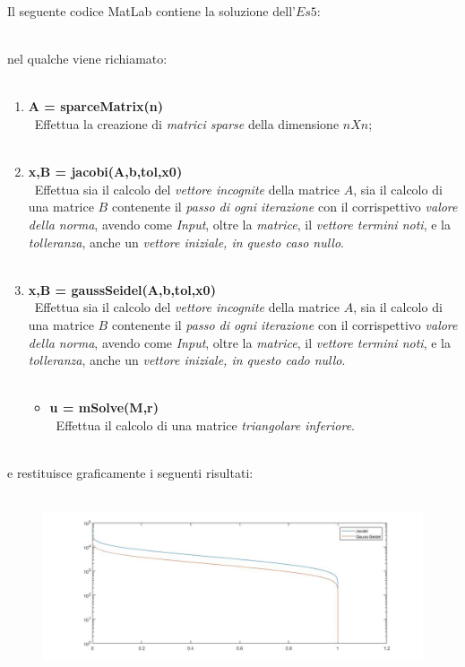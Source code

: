 Il seguente codice MatLab contiene la soluzione dell'$Es 5$:\\\
	
nel qualche viene richiamato:\\\
	\begin{enumerate}
		\item \textbf{A = sparceMatrix(n)}\\\
			Effettua la creazione di \textit{matrici sparse} della dimensione $nXn$;\\\
		\item \textbf{x,B = jacobi(A,b,tol,x0)}\\\
			Effettua sia il calcolo del \textit{vettore incognite} della matrice $A$, sia il calcolo di una matrice $B$ contenente il \textit{passo di ogni iterazione} con il corrispettivo \textit{valore della norma}, avendo come \textit{Input}, oltre la \textit{matrice}, il \textit{vettore termini noti}, e la \textit{tolleranza}, anche un \textit{vettore iniziale, in questo caso nullo}.\\\
		\item \textbf{x,B = gaussSeidel(A,b,tol,x0)}\\\
			Effettua sia il calcolo del \textit{vettore incognite} della matrice $A$, sia il calcolo di una matrice $B$ contenente il \textit{passo di ogni iterazione} con il corrispettivo \textit{valore della norma}, avendo come \textit{Input}, oltre la 	\textit{matrice}, il \textit{vettore termini noti}, e la \textit{tolleranza}, anche un \textit{vettore iniziale, in questo cado nullo}.\\\
		\begin{itemize}
			\item \textbf{u = mSolve(M,r)}\\\
				Effettua il calcolo di una matrice \textit{triangolare inferiore}.\\\
		\end{itemize}
	\end{enumerate}
e restituisce graficamente i seguenti risultati:\\\
	\begin{figure}[H]
		\includegraphics[width=\textwidth]{Plot/Cap_6_Es_5}
	\end{figure}